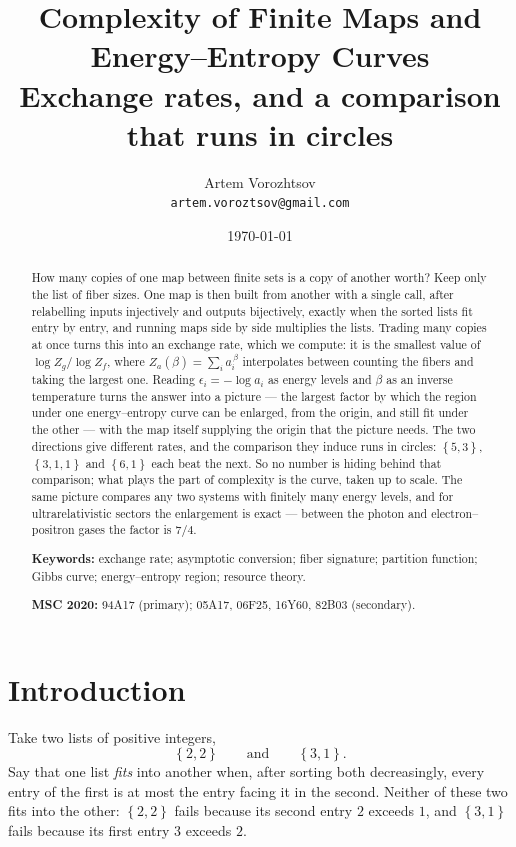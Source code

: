 \documentclass[11pt]{article}
\title{Complexity of Finite Maps and Energy--Entropy Curves\\
\large Exchange rates, and a comparison that runs in circles}
\author{Artem Vorozhtsov\\
\small\texttt{artem.voroztsov@gmail.com}}
\date{\today}
\theoremstyle{definition}
\theoremstyle{remark}
\newcommand{\sig}[1]{\left\{#1\right\}}
\begin{document}
\maketitle

\begin{abstract}
How many copies of one map between finite sets is a copy of another worth?
Keep only the list of fiber sizes.  One map is then built from another with a
single call, after relabelling inputs injectively and outputs bijectively,
exactly when the sorted lists fit entry by entry, and running maps side by
side multiplies the lists.  Trading many copies at once turns this into an
exchange rate, which we compute: it is the smallest value of
\(\log Z_g/\log Z_f\), where \(Z_a(\beta)=\sum_ia_i^{\,\beta}\) interpolates
between counting the fibers and taking the largest one.  Reading
\(\epsilon_i=-\log a_i\) as energy levels and \(\beta\) as an inverse
temperature turns the answer into a picture --- the largest factor by which the region under one
energy--entropy curve can be enlarged, from the origin, and still fit under
the other --- with the map itself supplying the origin that the picture
needs.  The two directions give different rates, and the comparison they
induce runs in circles: \(\sig{5,3}\), \(\sig{3,1,1}\) and \(\sig{6,1}\) each
beat the next.  So no number is hiding behind that comparison; what plays the
part of complexity is the curve, taken up to scale.  The same picture compares
any two systems with finitely many energy levels, and for ultrarelativistic
sectors the enlargement is exact --- between the photon and
electron--positron gases the factor is \(7/4\).

\medskip
\noindent\textbf{Keywords:} exchange rate; asymptotic conversion; fiber
signature; partition function; Gibbs curve; energy--entropy region; resource
theory.

\noindent\textbf{MSC 2020:} 94A17 (primary); 05A17, 06F25, 16Y60, 82B03 (secondary).
\end{abstract}

\section{Introduction}

Take two lists of positive integers,
\[
  \sig{2,2}
  \qquad\text{and}\qquad
  \sig{3,1}.
\]
Say that one list \emph{fits} into another when, after sorting both
decreasingly, every entry of the first is at most the entry facing it in the
second.  Neither of these two fits into the other: \(\sig{2,2}\) fails because
its second entry \(2\) exceeds \(1\), and \(\sig{3,1}\) fails because its
first entry \(3\) exceeds \(2\).
\end{document}
